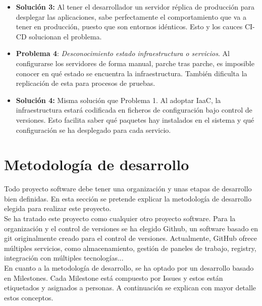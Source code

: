 \begin{itemize}
                        \item \textbf{Solución 3:} Al tener el desarrollador un servidor réplica de producción para desplegar las aplicaciones, sabe perfectamente el comportamiento que va a tener en producción, puesto que son entornos idénticos. Esto y los cauces CI-CD solucionan el problema.

                        \item \textbf{Problema 4}: \textit{Desconocimiento estado infraestructura o servicios}. Al configurarse los servidores de forma manual, parche tras parche, es imposible conocer en qué estado se encuentra la infraestructura. También dificulta la replicación de esta para procesos de pruebas.

                        \item \textbf{Solución 4:} Misma solución que Problema 1. Al adoptar IaaC, la infraestructura estará codificada en ficheros de configuración bajo control de versiones. Esto facilita saber qué paquetes hay instalados en el sistema y qué configuración se ha desplegado para cada servicio.
                \end{itemize}

\section{Metodología de desarrollo}
\begin{text}
        Todo proyecto software debe tener una organización y unas etapas de desarrollo bien definidas. En esta sección se pretende explicar la metodología de desarrollo elegida para realizar este proyecto. \\
        Se ha tratado este proyecto como cualquier otro proyecto software. Para la organización y el control de versiones se ha elegido Github, un software basado en git originalmente creado para el control de versiones. Actualmente, GitHub ofrece múltiples servicios, como almacenamiento, gestión de paneles de trabajo, registry, integración con múltiples tecnologías... \\
        En cuanto a la metodología de desarrollo, se ha optado por un desarrollo basado en Milestones. Cada Milestone está compuesto por Issues y estos están etiquetados y asignados a personas. A continuación se explican con mayor detalle estos conceptos.
\end{text}

